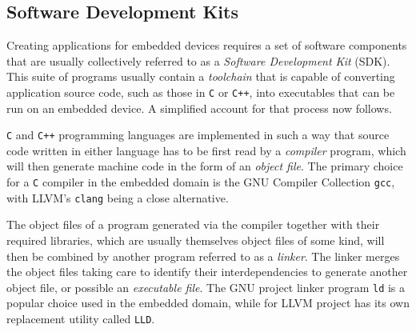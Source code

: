 \subsection{Software Development Kits}

Creating applications for embedded devices requires a set of software components that are usually collectively referred to as a \textit{Software Development Kit} (SDK). This suite of programs usually contain a \textit{toolchain} that is capable of converting application source code, such as those in \texttt{C}  or \texttt{C++}, into executables that can be run on an embedded device. A simplified account for that process now follows.

\texttt{C} and \texttt{C++} programming languages are implemented in such a way that source code written in either language has to be first read by a \textit{compiler} program, which will then generate machine code in the form of an \textit{object file}. The primary choice for a \texttt{C} compiler in the embedded domain is the GNU Compiler Collection \texttt{gcc}, with LLVM's \texttt{clang} being a close alternative.

\begin{figure}[H]
	\centering
\end{figure}

The object files of a program generated via the compiler together with their required libraries, which are usually themselves object files of some kind, will then be combined by another program referred to as a \textit{linker}. The linker merges the object files taking care to identify their interdependencies to generate another object file, or possible an \textit{executable file}. The GNU project linker program \texttt{ld} is a popular choice used in the embedded domain, while for LLVM project has its own replacement utility called \texttt{LLD}.

\begin{figure}[H]
	\centering
\end{figure}


